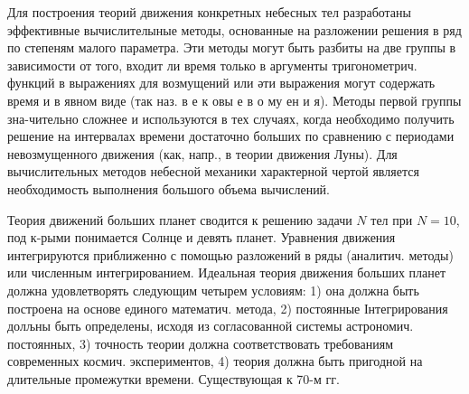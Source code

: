 \documentclass[10pt]{article}
\begin{document}
Для построения теорий движения конкретных небесных тел разработаны эффективные вычислителыные методы, основанные на разложении решения в ряд по степеням малого параметра. Эти методы могут быть разбиты на две группы в зависимости от того, входит ли время только в аргументы тригонометрич. функций в выражениях для возмущений или әти выражения могут содержать время и в явном виде (так наз. в е к овы е в о му ен и я). Методы первой группы зна-чительно сложнее и используются в тех случаях, когда необходимо получить решение на интервалах времени достаточно больших по сравнению с периодами невозмущенного движения (как, напр., в теории движения Луны). Для вычислительных методов небесной механики характерной чертой является необходимость выполнения большого объема вычислений.



Теория движений больших планет сводится к решению задачи $N$ тел при $N=10$, под к-рыми понимается Солнце и девять планет. Уравнения движения интегрируются приближенно с помощью разложений в ряды (аналитич. методы) или численным интегрированием. Идеальная теория движения больших планет должна удовлетворять следующим четырем условиям: 1) она должна быть построена на основе единого математич. метода, 2) постоянные Інтегрирования долљны быть определены, исходя из согласованной системы астрономич. постоянных, 3) точность теории должна соответствовать требованиям современных космич. экспериментов, 4) теория должна быть пригодной на длительные промежутки времени. Существующая к 70-м гг.
\end{document}
